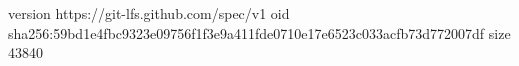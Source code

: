 version https://git-lfs.github.com/spec/v1
oid sha256:59bd1e4fbc9323e09756f1f3e9a411fde0710e17e6523c033acfb73d772007df
size 43840
